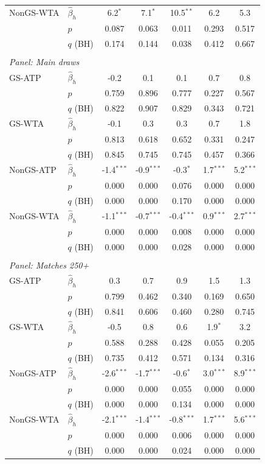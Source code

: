 \begin{tabular}{ll*{5}{c}}
NonGS-WTA & $\hat{\beta}_h$ & 6.2$^{*}$ & 7.1$^{*}$ & 10.5$^{**}$ & 6.2 & 5.3 \\
 & $p$ & 0.087 & 0.063 & 0.011 & 0.293 & 0.517 \\
 & $q$ (BH) & 0.174 & 0.144 & 0.038 & 0.412 & 0.667 \\[0.2em]
\\[0.3em]
\multicolumn{7}{l}{\textit{Panel: Main draws}} \\ \midrule
GS-ATP & $\hat{\beta}_h$ & -0.2 & 0.1 & 0.1 & 0.7 & 0.8 \\
 & $p$ & 0.759 & 0.896 & 0.777 & 0.227 & 0.567 \\
 & $q$ (BH) & 0.822 & 0.907 & 0.829 & 0.343 & 0.721 \\[0.2em]
GS-WTA & $\hat{\beta}_h$ & -0.1 & 0.3 & 0.3 & 0.7 & 1.8 \\
 & $p$ & 0.813 & 0.618 & 0.652 & 0.331 & 0.247 \\
 & $q$ (BH) & 0.845 & 0.745 & 0.745 & 0.457 & 0.366 \\[0.2em]
NonGS-ATP & $\hat{\beta}_h$ & -1.4$^{***}$ & -0.9$^{***}$ & -0.3$^{*}$ & 1.7$^{***}$ & 5.2$^{***}$ \\
 & $p$ & 0.000 & 0.000 & 0.076 & 0.000 & 0.000 \\
 & $q$ (BH) & 0.000 & 0.000 & 0.170 & 0.000 & 0.000 \\[0.2em]
NonGS-WTA & $\hat{\beta}_h$ & -1.1$^{***}$ & -0.7$^{***}$ & -0.4$^{***}$ & 0.9$^{***}$ & 2.7$^{***}$ \\
 & $p$ & 0.000 & 0.000 & 0.008 & 0.000 & 0.000 \\
 & $q$ (BH) & 0.000 & 0.000 & 0.028 & 0.000 & 0.000 \\[0.2em]
\\[0.3em]
\multicolumn{7}{l}{\textit{Panel: Matches 250+}} \\ \midrule
GS-ATP & $\hat{\beta}_h$ & 0.3 & 0.7 & 0.9 & 1.5 & 1.3 \\
 & $p$ & 0.799 & 0.462 & 0.340 & 0.169 & 0.650 \\
 & $q$ (BH) & 0.841 & 0.606 & 0.460 & 0.280 & 0.745 \\[0.2em]
GS-WTA & $\hat{\beta}_h$ & -0.5 & 0.8 & 0.6 & 1.9$^{*}$ & 3.2 \\
 & $p$ & 0.588 & 0.288 & 0.428 & 0.055 & 0.205 \\
 & $q$ (BH) & 0.735 & 0.412 & 0.571 & 0.134 & 0.316 \\[0.2em]
NonGS-ATP & $\hat{\beta}_h$ & -2.6$^{***}$ & -1.7$^{***}$ & -0.6$^{*}$ & 3.0$^{***}$ & 8.9$^{***}$ \\
 & $p$ & 0.000 & 0.000 & 0.055 & 0.000 & 0.000 \\
 & $q$ (BH) & 0.000 & 0.000 & 0.134 & 0.000 & 0.000 \\[0.2em]
NonGS-WTA & $\hat{\beta}_h$ & -2.1$^{***}$ & -1.4$^{***}$ & -0.8$^{***}$ & 1.7$^{***}$ & 5.6$^{***}$ \\
 & $p$ & 0.000 & 0.000 & 0.006 & 0.000 & 0.000 \\
 & $q$ (BH) & 0.000 & 0.000 & 0.024 & 0.000 & 0.000 \\[0.2em]
\bottomrule
\end{tabular}
